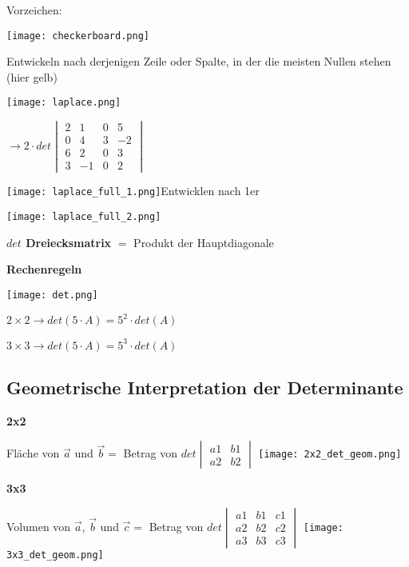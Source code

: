 \begin{multicols*}{3}
    {\begin{multicols}{2}
            Vorzeichen:

            \columnbreak
            { \texttt{[image: checkerboard.png]} }

        \end{multicols}}

    {{Entwickeln nach derjenigen Zeile oder Spalte, in
                der die meisten Nullen stehen (hier gelb)}}
    {\begin{multicols}{2}
            {\texttt{[image: laplace.png]}}
            \columnbreak

            {  $ \rightarrow  2 \cdot det \begin{vmatrix} 2 & 1 & 0 & 5 \\ 0 & 4 & 3 & -2 \\ 6 & 2 &0 & 3 \\ 3 & -1 &0 & 2 \end{vmatrix} $}
        \end{multicols}}

    {\texttt{[image: laplace\_full\_1.png]}Entwicklen nach 1er}

    {\texttt{[image: laplace\_full\_2.png]}}


    \textbf{$det$ Dreiecksmatrix}
    $ = $ Produkt der Hauptdiagonale
    \WhiteSpace

    \textbf{Rechenregeln}

    {\texttt{[image: det.png]}}

    $2\times 2 \rightarrow det(5 \cdot A) = 5^2 \cdot det(A)$

    $3\times 3 \rightarrow det(5 \cdot A) = 5^3 \cdot det(A)$

    \WhiteSpace
    \subsection{Geometrische Interpretation der Determinante }
    {\textbf{2x2}}

    {Fläche von $\vec{a} $ und $ \vec{b} = $ Betrag von $ det \begin{vmatrix} a1 & b1  \\ a2 & b2 \end{vmatrix} $}
    {\texttt{[image: 2x2\_det\_geom.png]}}




    \textbf{3x3}

    {Volumen von $\vec{a} $, $ \vec{b}$ und $\vec{c} = $ Betrag von $   det \begin{vmatrix} a1 & b1 & c1 \\ a2 & b2 & c2 \\ a3 & b3 & c3  \end{vmatrix}  $}
    {\texttt{[image: 3x3\_det\_geom.png]}}
    \mbox{}

\end{multicols*}


